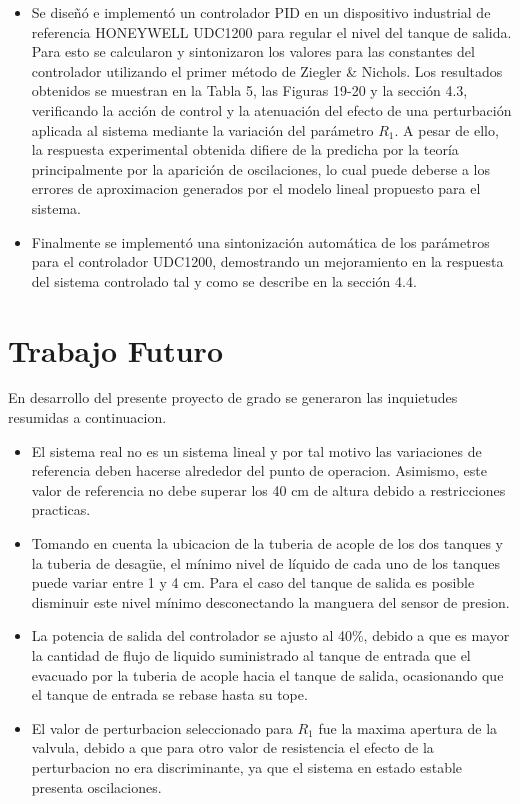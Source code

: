 \documentclass[a4paper,12pt,twoside]{proyectotanquesecci}
\begin{document}
\begin{itemize}
\item Se diseñó e implementó un controlador PID en un dispositivo industrial de referencia HONEYWELL UDC1200 para regular el nivel del tanque de salida. Para esto se calcularon y sintonizaron los valores para las constantes del controlador utilizando el primer método de Ziegler \& Nichols. Los resultados obtenidos se muestran en la Tabla 5, las Figuras 19-20 y la sección 4.3, verificando la acción de control y la atenuación del efecto de una perturbación aplicada al sistema mediante la variación del parámetro $R_{1}$. A pesar de ello, la respuesta experimental obtenida difiere de la predicha por la teoría principalmente por la aparición de oscilaciones, lo cual puede deberse a los errores de aproximacion generados por el modelo lineal propuesto para el sistema.
\item Finalmente se implementó una sintonización automática de los parámetros para el controlador UDC1200, demostrando un mejoramiento en la respuesta del sistema controlado tal y como se describe en la sección 4.4.
\end{itemize}







\chapter{Trabajo Futuro}

En desarrollo del presente proyecto de grado se generaron las inquietudes resumidas a continuacion. \\

\begin{itemize}
\item El sistema real no es un sistema lineal y por tal motivo las variaciones de referencia deben hacerse alrededor del punto de operacion. Asimismo, este valor de referencia no debe superar los 40 cm de altura debido a restricciones practicas.
\item Tomando en cuenta la ubicacion de la tuberia de acople de los dos tanques y la tuberia de desag\"ue, el mínimo nivel de líquido de cada uno de los tanques puede variar entre 1 y 4 cm. Para el caso del tanque de salida es posible disminuir este nivel mínimo desconectando la manguera del sensor de presion.
\item La potencia de salida del controlador se ajusto al 40\%, debido a que es mayor la cantidad de flujo de liquido suministrado al tanque de entrada que el evacuado por la tuberia de acople hacia el tanque de salida, ocasionando que el tanque de entrada se rebase hasta su tope.
\item El valor de perturbacion seleccionado para $R_{1}$ fue la maxima apertura de la valvula, debido a que para otro valor de resistencia el efecto de la perturbacion no era discriminante, ya que el sistema en estado estable presenta oscilaciones.
\end{itemize}
\end{document}
